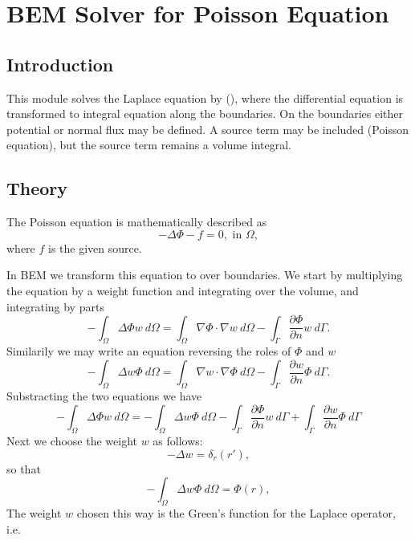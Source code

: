 \chapter{BEM Solver for Poisson Equation}

\begin{versiona}

\section{Introduction}

This module solves the Laplace equation by  (), where
the differential equation is transformed to integral equation along the
boundaries. On the boundaries either potential or normal flux may be defined.
A source term may be included (Poisson equation), but the source term remains
a volume integral.

\section{Theory}

The Poisson equation is mathematically described as
\begin{equation}
-\Delta \Phi - f = 0, \mbox{ in } \Omega,
\end{equation}
where $f$ is the given source.

In BEM we transform this equation to  over boundaries. We start
by multiplying the equation by a weight function and integrating over the volume,
and integrating by parts
\begin{equation}
-\int_\Omega \Delta \Phi w\ d\Omega  = \int_\Omega \nabla\Phi\cdot \nabla w\ d\Omega  -
\int_\Gamma \frac{\partial\Phi}{\partial n} w\ d\Gamma.
\end{equation}
Similarily we may write an equation reversing the roles of $\Phi$ and $w$
\begin{equation}
-\int_\Omega \Delta w \Phi\ d\Omega = \int_\Omega \nabla w\cdot \nabla \Phi\ d\Omega  -
\int_\Gamma \frac{\partial w}{\partial n} \Phi\ d\Gamma.
\end{equation}
Substracting the two equations we have
\begin{equation}
-\int_\Omega \Delta \Phi w\ d\Omega =
-\int_\Omega \Delta w \Phi\ d\Omega -
\int_\Gamma \frac{\partial\Phi}{\partial n} w\ d\Gamma +
\int_\Gamma \frac{\partial w}{\partial n} \Phi\ d\Gamma
\end{equation}
Next we choose the weight $w$ as follows:
\begin{equation}
-\Delta w = \delta_r(r'),
\end{equation}
so that 
\begin{equation}
-\int_\Omega \Delta w \Phi\ d\Omega = \Phi(r), 
\end{equation}
The weight $w$ chosen this way is the Green's function for the Laplace operator,
i.e.


\end{versiona}
